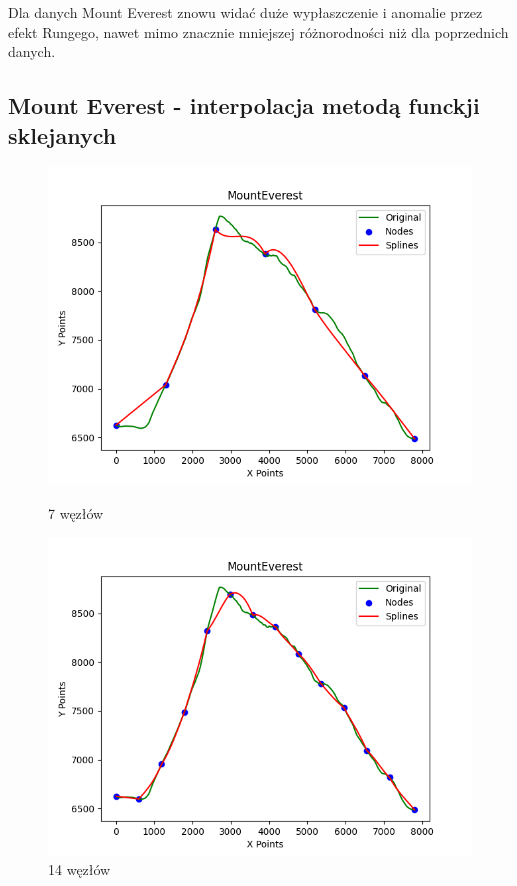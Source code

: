 \documentclass{article}
\begin{document}
Dla danych Mount Everest znowu widać duże wypłaszczenie i anomalie przez efekt Rungego, nawet mimo znacznie mniejszej różnorodności niż dla poprzednich danych.

\subsection{Mount Everest - interpolacja metodą funckji sklejanych}

\begin{figure}[H]
    \centering
    \begin{minipage}[b]{0.49\textwidth}
        \centering
        \includegraphics[width=\textwidth]{plots/MountEverest_splines_7.png}
        \caption{7 węzłów}
        \label{fig:7nodes}
    \end{minipage}
    \hfill
    \begin{minipage}[b]{0.49\textwidth}
        \centering
        \includegraphics[width=\textwidth]{plots/MountEverest_splines_14.png}
        \caption{14 węzłów}
        \label{fig:14nodes}
    \end{minipage}
\end{figure}
\end{document}

